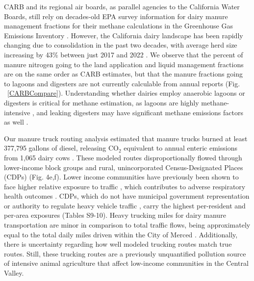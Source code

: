 \documentclass{iopjournal}
\begin{document}
CARB and its regional air boards, as parallel agencies to the California Water Boards, still rely on decades-old EPA survey information for dairy manure management fractions \cite{EPA_Inventory_Annexes_2013} for their methane calculations in the Greenhouse Gas Emissions Inventory \cite{CARB_2000-2023_GHG, CARB_2000_2023_GHG_Methods}. However, the California dairy landscape has been rapidly changing due to consolidation in the past two decades, with average herd size increasing by 43\% between just 2017 and 2022 \cite{ERA_2024}. We observe that the percent of manure nitrogen going to the land application and liquid management fractions are on the same order as CARB estimates, but that the manure fractions going to lagoons and digesters are not currently calculable from annual reports (Fig. ~\ref{CARBCompare}). Understanding whether dairies employ anaerobic lagoons or digesters is critical for methane estimation, as lagoons are highly methane-intensive \cite{CARB_2000-2023_GHG, Owen_2015, Naranjo_2020}, and leaking digesters may have significant methane emissions factors as well \cite{Wainer_2025}.

Our manure truck routing analysis estimated that manure trucks burned at least 377,795 gallons of diesel, releasing $\text{CO}_2$ equivalent to annual enteric emissions from 1,065 dairy cows \cite{CARB_2000-2023_GHG}. These modeled routes disproportionally flowed through lower-income block groups and rural, unincorporated Census-Designated Places (CDPs) (Fig. 4e,f). Lower income communities have previously been shown to face higher relative exposure to traffic \cite{Rowangould_2013, Gunier_2003}, which contributes to adverse respiratory health outcomes \cite{Gauderman_2007}. CDPs, which do not have municipal government representation or authority to regulate heavy vehicle traffic \cite{CA_Code_35700}, carry the highest per-resident and per-area exposures (Tables S9-10). Heavy trucking miles for dairy manure transportation are minor in comparison to total traffic flows, being approximately equal to the total daily miles driven within the City of Merced \cite{CDOT_2024}. Additionally, there is uncertainty regarding how well modeled trucking routes match true routes. Still, these trucking routes are a previously unquantified pollution source of intensive animal agriculture that affect low-income communities in the Central Valley.
\end{document}
